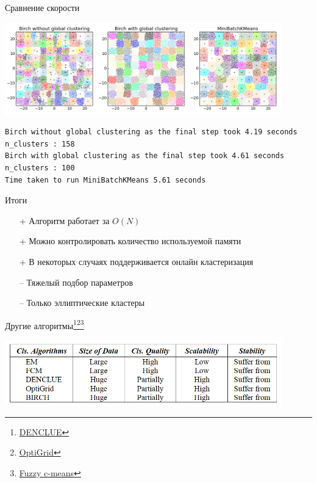 \documentclass[aspectratio=169]{beamer}
\begin{document}
\begin{frame}[fragile]{Сравнение скорости}

\begin{center}
\includegraphics[width=0.9\textwidth]{images/compare.png}
\end{center}

\begin{verbatim}
Birch without global clustering as the final step took 4.19 seconds
n_clusters : 158
Birch with global clustering as the final step took 4.61 seconds
n_clusters : 100
Time taken to run MiniBatchKMeans 5.61 seconds
\end{verbatim}

\end{frame}

\begin{frame}{Итоги}

\begin{itemize}
\item[+] Алгоритм работает за $O(N)$
\item[+] Можно контролировать количество используемой памяти
\item[+] В некоторых случаях поддерживается онлайн кластеризация
\item[--] Тяжелый подбор параметров
\item[--] Только эллиптические кластеры
\end{itemize}

\end{frame}

\begin{frame}{Другие алгоритмы\footnote{\href{http://bib.dbvis.de/uploadedFiles/176.pdf}{DENCLUE}}\footnote{\href{http://fusion.cs.uni-magdeburg.de/pubs/optigrid.pdf}{OptiGrid}}\footnote{\href{https://www.wikiwand.com/en/Fuzzy_clustering}{Fuzzy c-means}}}

\begin{center}
\includegraphics[width=0.9\textwidth]{images/summary.png}
\end{center}

\end{frame}
\end{document}
